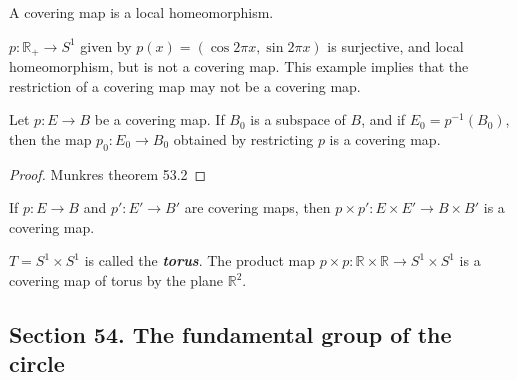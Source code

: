 \begin{myproposition}
A covering map is a local homeomorphism.
\end{myproposition}
\begin{example}
$p:\mathbb{R}_+\to S^1$ given by $p(x)=(\cos 2\pi x,\sin 2\pi x)$ is surjective, and local homeomorphism, but is not a covering map. This example implies that the restriction of a covering map may not be a covering map.
\end{example}

\begin{mytheorem}
Let $p:E\to B$ be a covering map. If $B_0$ is a subspace of $B$, and if $E_0=p^{-1}(B_0)$, then the map $p_0:E_0\to B_0$ obtained by restricting $p$ is a covering map.
\end{mytheorem}
\begin{proof}
Munkres theorem 53.2
\end{proof}

\begin{mytheorem}
If $p:E\to B$ and $p':E'\to B'$ are covering maps, then $p\times p':E\times E'\to B\times B'$ is a covering map.
\end{mytheorem}
\begin{exercise}
$T=S^1\times S^1$ is called the \textbf{\emph{torus}}. The product map $p\times p:\mathbb{R}\times \mathbb{R}\to S^1\times S^1$ is a covering map of torus by the plane $\mathbb{R}^2$.
\end{exercise}

\subsection{Section 54. The fundamental group of the circle}
